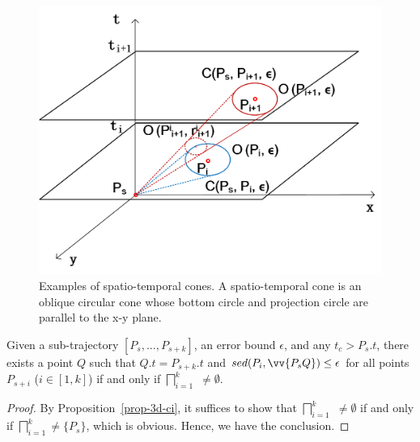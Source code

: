 \begin{figure}[tb!]
\centering
\includegraphics[scale=0.6]{figures/Fig-cis.png}
\vspace{-2ex}
\caption{\small Examples of spatio-temporal cones. A spatio-temporal cone is an oblique circular cone whose bottom circle and projection circle are parallel to the x-y plane. }
\vspace{-2ex}
\label{fig:cis}
\end{figure}





\begin{prop}
\label{prop-circle-intersection}
Given a sub-trajectory $[P_s,...,P_{s+k}]$, an error bound $\epsilon$, and any $t_c > P_s.t$, there exists a point $Q$ such that $Q.t = P_{s+k}.t$ and $sed(P_i, \vv{P_sQ})\le \epsilon$ for all points $P_{s+i}$ ($i \in [1,k]$) if and only if $\bigsqcap_{i=1}^{k}$ $\ne \emptyset$.
\end{prop}


\begin{proof}
By Proposition~\ref{prop-3d-ci}, it suffices to show that $\bigsqcap_{i=1}^{k}$  $\ne \emptyset$ if and only if $\bigsqcap_{i=1}^{k}$$\ne \{P_s\}$, which is obvious. Hence, we have the conclusion.
\end{proof}

